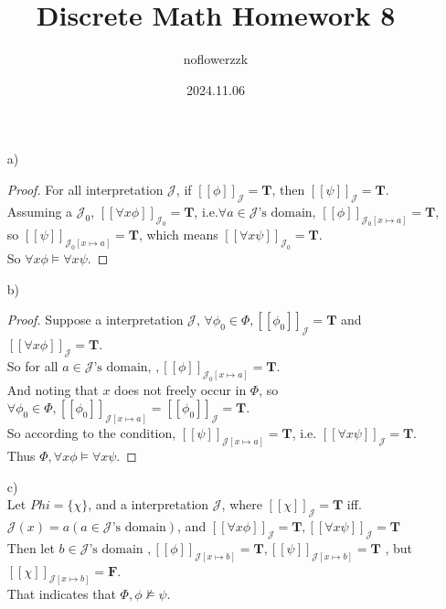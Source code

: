 \documentclass{article}
\title{Discrete Math Homework 8}
\author{noflowerzzk}
\date{2024.11.06}
\newcommand{\lb}{[\![}
\newcommand{\rb}{]\!]}
\newcommand{\JJ}{\mathcal{J}}
\newcommand{\T}{\mathbf{T}}
\newcommand{\F}{\mathbf{F}}
\begin{document}
\maketitle

\section{}

\begin{itemize}
    \item [a)]
    \begin{proof}
        For all interpretation $\JJ$, if $\lb \phi\rb_\JJ = \mathbf{T}$, then $\lb \psi \rb_\JJ = \mathbf{T}$. \\
        Assuming a $\JJ_0$, $\lb \forall x \phi\rb_{\JJ_0} = \T$, i.e.$\forall a \in \JJ\text{'s domain, }\lb \phi\rb_{\JJ_0[x \mapsto a]} = \T$, so $\lb \psi\rb_{\JJ_0[x \mapsto a]} = \T$, which means $\lb \forall x \psi\rb_{\JJ_0} = \T$. \\
        So $\forall x \phi \models \forall x \psi$.
    \end{proof}
    \item [b)]
    \begin{proof}
        Suppose a interpretation $\JJ$, $\forall \phi_0 \in \Phi, \lb\phi_0\rb_\JJ = \T$ and $\lb\forall x \phi\rb_\JJ = \T$. \\
        So for all $a \in \JJ\text{'s domain, }, \lb \phi\rb_{\JJ_0[x \mapsto a]} = \T$. \\
        And noting that $x$ does not freely occur in $\Phi$, so $\forall \phi_0 \in \Phi, \lb\phi_0\rb_{\JJ[x \mapsto a]} = \lb \phi_0 \rb_\JJ = \T$. \\
        So according to the condition, $\lb \psi \rb_{\JJ[x\mapsto a]} = \T$, i.e. $\lb \forall x \psi \rb_\JJ = \T$. \\
        Thus $\Phi, \forall x \phi \models \forall x \psi$.
    \end{proof}
    \item [c)] \quad \\
    Let $Phi = \{\chi\}$, and a interpretation $\JJ$, where $\lb \chi \rb_\JJ = \T$ iff. $\JJ(x) = a (a \in \JJ\text{'s domain})$, and $\lb \forall x\phi \rb_\JJ = \T, \lb \forall x\psi \rb_\JJ = \T$ \\
    Then let $b \in \JJ\text{'s domain }, \lb \phi \rb_{\JJ[x \mapsto b]} = \T, \lb \psi \rb_{\JJ[x \mapsto b]} = \T$ , but $\lb \chi \rb_{\JJ[x \mapsto b]} = \F$. \\
    That indicates that $\Phi, \phi \not\models \psi$.
\end{itemize}
\end{document}
